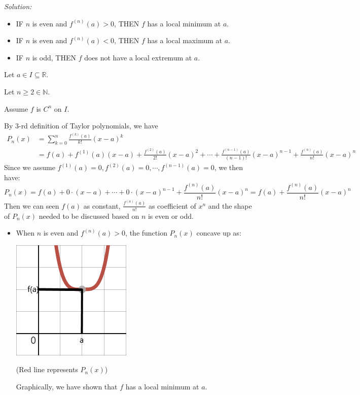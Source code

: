 \documentclass[12pt]{exam}
\newcommand{\R}{\mathbb{R}}
\newcommand{\N}{\mathbb{N}}
\begin{document}
\begin{enumerate}
\begin{enumerate}
		\emph{Solution:}
		    \begin{itemize}
				\item  IF $n$ is even and $f^{(n)}(a)>0$, THEN $f$ has a local minimum at $a$.
				\item  IF $n$ is even and $f^{(n)}(a)<0$, THEN $f$ has a local maximum at $a$.
				\item  IF $n$ is odd, THEN $f$ does not have a local extremum at $a$.
			\end{itemize}
		    Let $a \in I\subseteq\R$.
			
			Let $n\geq2\in\N$.
			
			Assume $f$ is $C^n$ on $I$.
			
			By 3-rd definition of Taylor polynomials, we have
			\begin{align*}
			    P_n(x)&=\sum_{k=0}^n \frac{f^{(k)}(a)}{k!}(x-a)^k\\
			    &=f(a)+f^{(1)}(a)(x-a)+\frac{f^{(2)}(a)}{2!}(x-a)^2+\cdots+\frac{f^{(n-1)}(a)}{(n-1)!}(x-a)^{n-1}+\frac{f^{(n)}(a)}{n!}(x-a)^n
			\end{align*}
			Since we assume $f^{(1)}(a)=0,f^{(2)}(a)=0,\cdots,f^{(n-1)}(a)=0$, we then have:
			$$
			    P_n(x)=f(a)+0\cdot(x-a)+\cdots+0\cdot(x-a)^{n-1}+\frac{f^{(n)}(a)}{n!}(x-a)^n=f(a)+\frac{f^{(n)}(a)}{n!}(x-a)^n
			$$
			Then we can seen $f(a)$ as constant, $\frac{f^{(n)}(a)}{n!}$ as coefficient of $x^n$ and the shape of $P_n(x)$ needed to be discussed based on $n$ is even or odd.
			\begin{itemize}
			    \item When $n$ is even and $f^{(n)}(a)>0$, the function $P_n(x)$ concave up as:
			        \begin{center}
			            \includegraphics[scale=0.75]{Upward-n}
			    
			            (Red line represents $P_n(x)$)
			        \end{center}
			        Graphically, we have shown that $f$ has a local minimum at $a$.
			

\end{itemize}
\end{enumerate}
\end{enumerate}
\end{document}
